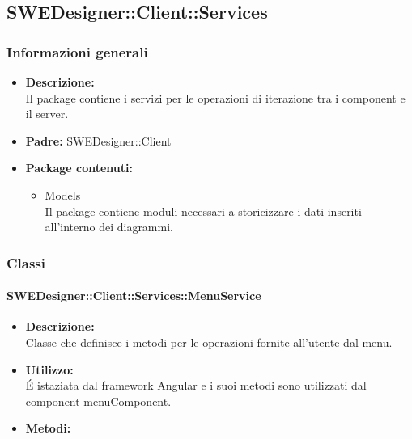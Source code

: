     \subsection{SWEDesigner::Client::Services}
		\subsubsection{Informazioni generali}
			\begin{itemize}
          		\item \textbf{Descrizione:}\\
          		Il package contiene i servizi per le operazioni di iterazione tra i component e il server.
          		\item \textbf{Padre:} SWEDesigner::Client
          		\item \textbf{Package contenuti:}\\
          		\begin{itemize}
          			\item Models\\
          			Il package contiene moduli necessari a storicizzare i dati inseriti all’interno dei diagrammi.
          		\end{itemize}
          	\end{itemize}
		\subsubsection{Classi}
			\paragraph{SWEDesigner::Client::Services::MenuService}
				\begin{itemize}
          			\item \textbf{Descrizione:}\\
          			Classe che definisce i metodi per le operazioni fornite all’utente dal menu.
          			\item \textbf{Utilizzo:}\\
          			É istaziata dal framework Angular e i suoi metodi sono utilizzati dal component menuComponent.
          			\item \textbf{Metodi:}\\
          		\end{itemize}
